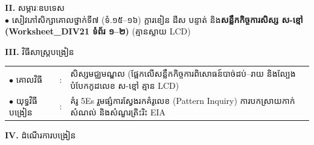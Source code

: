 \documentclass[a4paper,10pt]{article}
\newcommand{\en}[1]{{\TimesEn #1}}
\begin{document}
{%
\textbf{II.} {\muol សម្ភារៈឧបទេស}\\[1pt]
\hspace*{0.55cm}$\bullet$ \hspace{0.35cm} សៀវភៅសិក្សាគោលថ្នាក់ទី៧ (ទំ.១៥--១៦) ក្ដារខៀន ដីស បន្ទាត់ និង\textbf{សន្លឹកកិច្ចការសិស្ស ស-ខ្មៅ (\en{Worksheet\_DIV21} ទំព័រ ១--២)} (គ្មានស្លាយ \en{LCD})

\vspace{1pt}

\textbf{III.} {\muol វិធីសាស្រ្តបង្រៀន}\\[1pt]
\hspace*{0.45cm}%
\begin{tabular}{@{}l l L{14.85cm}@{}}
  $\bullet$ \hspace{0.25cm} គោលវិធី & : & សិស្សមជ្ឈមណ្ឌល (ផ្អែកលើសន្លឹកកិច្ចការពិសោធន៍បាច់ដប់--រាយ និងល្បែងបំបែកកូដលេខ ស-ខ្មៅ គ្មាន \en{LCD}) \\
  $\bullet$ \hspace{0.25cm} យុទ្ធវិធីបង្រៀន & : & គំរូ 5Es រួមផ្សំការស្វែងរកគំរូលេខ (\en{Pattern Inquiry}) ការបកស្រាយកាក់សំណល់ និងសំណួរត្រិះរិះ \en{EIA} \\
\end{tabular}
}

\vspace{1pt}

\textbf{IV.} {\muol ដំណើរការបង្រៀន}

\vspace{1pt}
\end{document}
